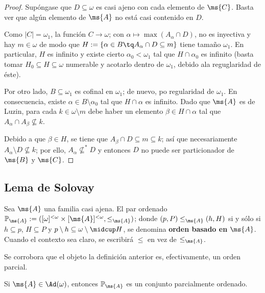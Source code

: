 	\begin{proof}
		Supóngase que $D \subseteq \omega$ es casi ajeno con cada elemento de $\ms{C}$. Basta ver que algún elemento de $\ms{A}$ no está casi contenido en $D$.

		Como $|C|=\omega_1$, la función $C \to \omega$; con $\alpha \mapsto \max(A_\alpha \cap D)$, no es inyectiva y hay $m \in \omega$ de modo que $H:=\{ \alpha \in B \tq A_\alpha \cap D \subseteq m \}$ tiene tamaño $\omega_1$. En particular, $H$ es infinito y existe cierto $\alpha_0 < \omega_1$ tal que $H \cap \alpha_0$ es infinito (basta tomar $H_0 \subseteq H \subseteq \omega$ numerable y acotarlo dentro de $\omega_1$, debido ala reguglaridad de éste).

		Por otro lado, $B \subseteq \omega_1$ es cofinal en $\omega_1$; de nuevo, po regularidad de $\omega_1$. En consecuencia, existe $\alpha \in B \setminus \alpha_0$ tal que $H \cap \alpha$ es infinito. Dado que $\ms{A}$ es de Luzin, para cada $k \in \omega \setminus m$ debe haber un elemento $\beta \in H \cap \alpha$ tal que $A_\alpha \cap A_\beta \not\subseteq k$.
		
		Debido a que $\beta \in H$, se tiene que $A_\beta \cap D \subseteq m \subseteq k$; así que necesariamente $A_\alpha \setminus D \not \subseteq k$; por ello, $A_\alpha \not \subseteq ^* D$ y entonces $D$ no puede ser particionador de $\ms{B}$ y $\ms{C}$. 
	\end{proof}

	\subsection{Lema de Solovay}

	\begin{definicion}\label{def-ordenBasado} 
		Sea $\ms{A}$ una familia casi ajena. El par ordenado $\mathbb{P}_\ms{A}:=([\omega]^{<\omega} \times [\ms{A}]^{<\omega}, \leq_\ms{A})$; donde $(p,P) \leq_\ms{A} (h,H)$ si y sólo si $h \subseteq p$, $H \subseteq P$ y $p \setminus h \subseteq \omega \setminus \midcup H$, se denomina \textbf{orden basado en} $\ms{A}$. Cuando el contexto sea claro, se escribirá $\leq$ en vez de $\leq_\ms{A}$.
	\end{definicion}

	Se corrobora que el objeto la definición anterior es, efectivamente, un orden parcial.

	\begin{proposicion}
		Si $\ms{A} \in \Ad(\omega)$, entonces $\mathbb{P}_\ms{A}$ es un conjunto parcialmente ordenado.
	\end{proposicion}

